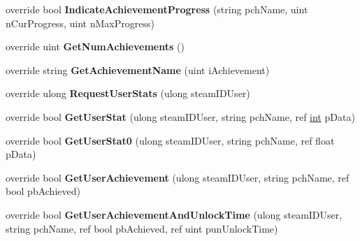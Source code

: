 \begin{DoxyCompactItemize}
\item 
\hypertarget{classValve_1_1Steamworks_1_1CSteamUserStats_abc14f4c903defb49cab82b2b359cb8ce}{}override bool {\bfseries Indicate\+Achievement\+Progress} (string pch\+Name, uint n\+Cur\+Progress, uint n\+Max\+Progress)\label{classValve_1_1Steamworks_1_1CSteamUserStats_abc14f4c903defb49cab82b2b359cb8ce}

\item 
\hypertarget{classValve_1_1Steamworks_1_1CSteamUserStats_a352d75354a9ced4dd2f29044514f5cab}{}override uint {\bfseries Get\+Num\+Achievements} ()\label{classValve_1_1Steamworks_1_1CSteamUserStats_a352d75354a9ced4dd2f29044514f5cab}

\item 
\hypertarget{classValve_1_1Steamworks_1_1CSteamUserStats_a997cb47bee322fa78479bb5604684349}{}override string {\bfseries Get\+Achievement\+Name} (uint i\+Achievement)\label{classValve_1_1Steamworks_1_1CSteamUserStats_a997cb47bee322fa78479bb5604684349}

\item 
\hypertarget{classValve_1_1Steamworks_1_1CSteamUserStats_a6f0833286f48dff64d83b33712ec7613}{}override ulong {\bfseries Request\+User\+Stats} (ulong steam\+I\+D\+User)\label{classValve_1_1Steamworks_1_1CSteamUserStats_a6f0833286f48dff64d83b33712ec7613}

\item 
\hypertarget{classValve_1_1Steamworks_1_1CSteamUserStats_a93d5586de00e9f71c0750e6c80032019}{}override bool {\bfseries Get\+User\+Stat} (ulong steam\+I\+D\+User, string pch\+Name, ref \hyperlink{SDL__thread_8h_a6a64f9be4433e4de6e2f2f548cf3c08e}{int} p\+Data)\label{classValve_1_1Steamworks_1_1CSteamUserStats_a93d5586de00e9f71c0750e6c80032019}

\item 
\hypertarget{classValve_1_1Steamworks_1_1CSteamUserStats_a5f850b5891b5432d74424b489c3af939}{}override bool {\bfseries Get\+User\+Stat0} (ulong steam\+I\+D\+User, string pch\+Name, ref float p\+Data)\label{classValve_1_1Steamworks_1_1CSteamUserStats_a5f850b5891b5432d74424b489c3af939}

\item 
\hypertarget{classValve_1_1Steamworks_1_1CSteamUserStats_a874f6329d578c9207adf6a24a7deeedb}{}override bool {\bfseries Get\+User\+Achievement} (ulong steam\+I\+D\+User, string pch\+Name, ref bool pb\+Achieved)\label{classValve_1_1Steamworks_1_1CSteamUserStats_a874f6329d578c9207adf6a24a7deeedb}

\item 
\hypertarget{classValve_1_1Steamworks_1_1CSteamUserStats_a5f51cc6ea97d9966ccfd496194db2fb4}{}override bool {\bfseries Get\+User\+Achievement\+And\+Unlock\+Time} (ulong steam\+I\+D\+User, string pch\+Name, ref bool pb\+Achieved, ref uint pun\+Unlock\+Time)\label{classValve_1_1Steamworks_1_1CSteamUserStats_a5f51cc6ea97d9966ccfd496194db2fb4}


\end{DoxyCompactItemize}
